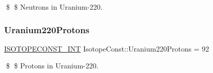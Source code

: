 \$ \$ Neutrons in Uranium-\/220. \mbox{\label{group___isotope_const-_uranium-_u220_ga42d6b021c6c02d1dfede03c27237c342}} 
\subsubsection{\texorpdfstring{Uranium220\+Protons}{Uranium220Protons}}
{\footnotesize\ttfamily \mbox{\hyperlink{group___isotope_const-_macros_ga5f18360b3e99483a35c32d789e62621c}{I\+S\+O\+T\+O\+P\+E\+C\+O\+N\+S\+T\+\_\+\+I\+NT}} Isotope\+Const\+::\+Uranium220\+Protons = 92}

\$ \$ Protons in Uranium-\/220. 